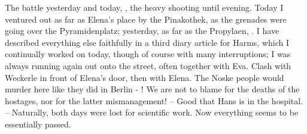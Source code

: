 
The battle yesterday and today, , the heavy shooting until evening. Today I ventured out as far as Elena's place by the Pinakothek, as the grenades were going over the Pyramidenplatz; yesterday, as far as the Propylaen, . I have described everything else faithfully in a third diary article for Harms, which I continually worked on today, though of course with many interruptions; I was always running again out onto the street, often together with Eva. Clash with Weckerle in front of Elena's door, then with Elena. The Noske people would murder here like they did in Berlin - ! We are not to blame for the deaths of the hostages, nor for the latter mismanagement! -- Good that Hans is in the hospital. -- Naturally, both days were lost for scientific work. Now everything seems to be essentially passed.